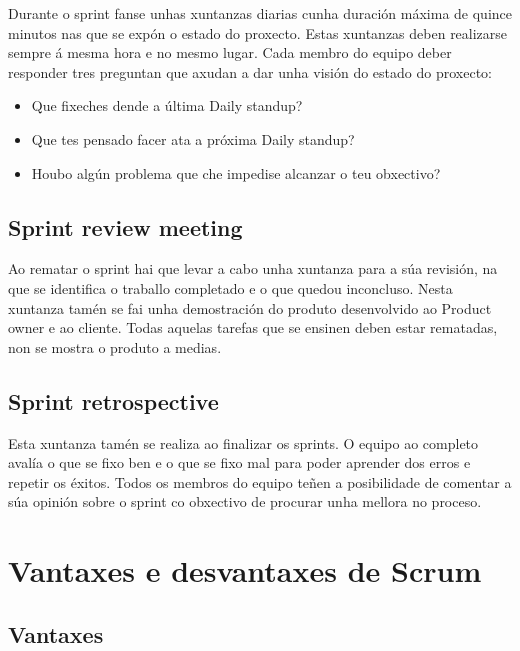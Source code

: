 Durante o sprint fanse unhas xuntanzas diarias cunha duración máxima de quince minutos nas que se expón o estado do proxecto. Estas xuntanzas deben realizarse sempre á mesma hora e no mesmo lugar. Cada membro do equipo deber responder tres preguntan que axudan a dar unha visión do estado do proxecto:

\begin{itemize}
	\item Que fixeches dende a última Daily standup?
	\item Que tes pensado facer ata a próxima Daily standup?
	\item Houbo algún problema que che impedise alcanzar o teu obxectivo?
\end{itemize}

\subsection{Sprint review meeting}

Ao rematar o sprint hai que levar a cabo unha xuntanza para a súa revisión, na que se identifica o traballo completado e o que quedou inconcluso. Nesta xuntanza tamén se fai unha demostración do produto desenvolvido ao Product owner e ao cliente. Todas aquelas tarefas que se ensinen deben estar rematadas, non se mostra o produto a medias.

\subsection{Sprint retrospective}

Esta xuntanza tamén se realiza ao finalizar os sprints. O equipo ao completo avalía o que se fixo ben e o que se fixo mal para poder aprender dos erros e repetir os éxitos. Todos os membros do equipo teñen a posibilidade de comentar a súa opinión sobre o sprint co obxectivo de procurar unha mellora no proceso.

\section{Vantaxes e desvantaxes de Scrum}

\subsection{Vantaxes}

